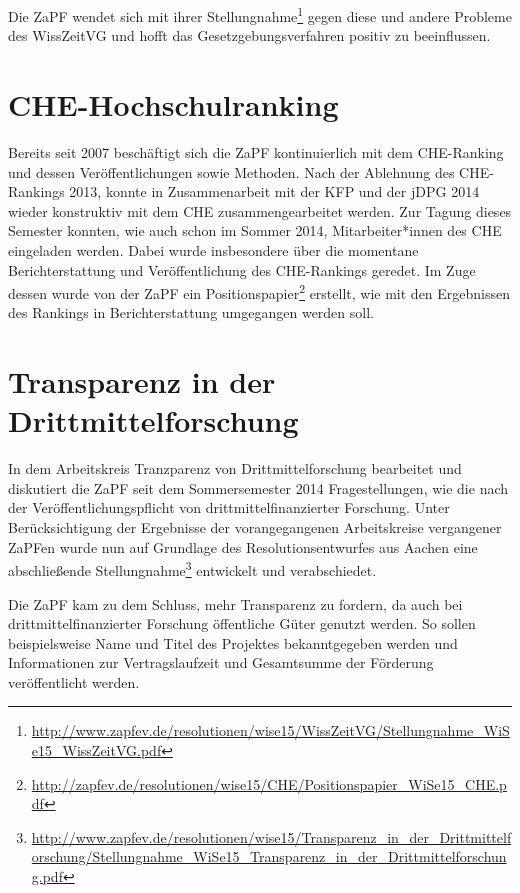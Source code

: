 Die ZaPF wendet sich mit ihrer
Stellungnahme\footnote{\href{http://www.zapfev.de/resolutionen/wise15/WissZeitVG/Stellungnahme\_WiSe15\_WissZeitVG.pdf}{\url{http://www.zapfev.de/resolutionen/wise15/WissZeitVG/Stellungnahme\_WiSe15\_WissZeitVG.pdf}}}
gegen diese und andere Probleme des WissZeitVG und hofft das
Gesetzgebungsverfahren positiv zu beeinflussen.

\section*{CHE-Hochschulranking}
Bereits seit 2007 beschäftigt sich die ZaPF kontinuierlich mit dem CHE-Ranking
und dessen Veröffentlichungen sowie Methoden. Nach der Ablehnung des CHE-Rankings
2013, konnte in Zusammenarbeit mit der KFP und der jDPG 2014 wieder konstruktiv
mit dem CHE zusammengearbeitet werden. Zur Tagung dieses Semester konnten, wie auch schon im Sommer 2014,
Mitarbeiter*innen des CHE eingeladen werden. Dabei wurde insbesondere über die
momentane Berichterstattung und Veröffentlichung des CHE-Rankings geredet. Im
Zuge dessen wurde von der ZaPF ein
Positionspapier\footnote{\href{http://zapfev.de/resolutionen/wise15/CHE/Positionspapier\_WiSe15\_CHE.pdf}{\url{http://zapfev.de/resolutionen/wise15/CHE/Positionspapier\_WiSe15\_CHE.pdf}}}
erstellt, wie mit den Ergebnissen des Rankings in Berichterstattung umgegangen
werden soll.

\section*{Transparenz in der Drittmittelforschung}
In dem Arbeitskreis \glqq{}Tranzparenz von Drittmittelforschung\grqq{}
bearbeitet und diskutiert die ZaPF seit dem Sommersemester 2014 Fragestellungen,
wie die nach der Veröffentlichungspflicht von drittmittelfinanzierter Forschung.
Unter Berücksichtigung der Ergebnisse der vorangegangenen Arbeitskreise
vergangener ZaPFen wurde nun auf Grundlage des Resolutionsentwurfes aus Aachen
eine abschließende
Stellungnahme\footnote{\href{http://www.zapfev.de/resolutionen/wise15/Transparenz\_in\_der\_Drittmittelforschung/Stellungnahme\_WiSe15\_Transparenz\_in\_der\_Drittmittelforschung.pdf}{\url{http://www.zapfev.de/resolutionen/wise15/Transparenz\_in\_der\_Drittmittelforschung/Stellungnahme\_WiSe15\_Transparenz\_in\_der\_Drittmittelforschung.pdf}}}
entwickelt und verabschiedet.

Die ZaPF kam zu dem Schluss, mehr Transparenz zu fordern, da auch bei
drittmittelfinanzierter Forschung öffentliche Güter genutzt werden. So sollen
beispielsweise Name und Titel des Projektes bekanntgegeben werden und
Informationen zur Vertragslaufzeit und Gesamtsumme der Förderung veröffentlicht
werden.

